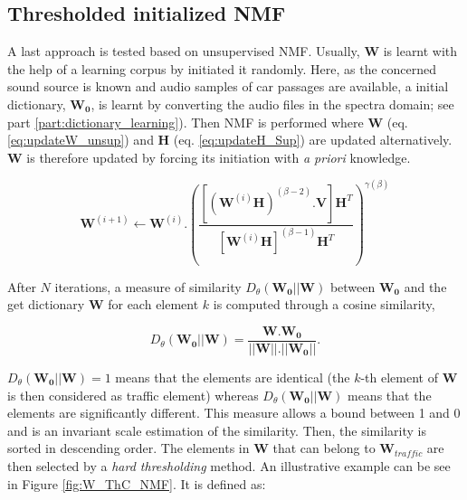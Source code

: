 \documentclass[twocolumn,a4paper,10pt]{article}
\begin{document}
\subsection{Thresholded initialized NMF}

A last approach is tested based on unsupervised NMF. Usually, $\mathbf{W}$ is learnt with the help of a learning corpus by initiated it randomly. Here, as the concerned sound source is known and audio samples of car passages are available, a initial dictionary, $\mathbf{W_0}$, is learnt by converting the audio files in the spectra domain; see part \ref{part:dictionary_learning}). Then NMF is performed where $\mathbf{W}$ (eq. \ref{eq:updateW_unsup}) and $\mathbf{H}$ (eq.  \ref{eq:updateH_Sup}) are updated alternatively. $\mathbf{W}$ is therefore updated by forcing its initiation with \textit{a priori} knowledge.

\begin{equation}\label{eq:updateW_unsup}
\textbf{W}^{(i+1)} \leftarrow \mathbf{W}^{(i)}.\left(\frac{\left[\left(\mathbf{W}^{(i)}\mathbf{H} \right)^{(\beta-2)}.\mathbf{V} \right]\mathbf{H}^T}{\left[\mathbf{W}^{(i)}\mathbf{H} \right]^{(\beta-1)}\mathbf{H}^T}\right)^{\gamma(\beta)}
\end{equation}

After $N$ iterations, a measure of similarity $D_{\theta}\left(\mathbf{W_0} \vert \vert \mathbf{W} \right)$ between $\mathbf{W_0}$ and the get dictionary $\mathbf{W}$ for each element $k$ is computed through a cosine similarity,

\begin{equation}
D_{\theta}\left(\mathbf{W_0} \vert \vert \mathbf{W} \right) = \frac{\mathbf{W}.\mathbf{W_0}}{\vert \vert \mathbf{W}  \vert \vert . \vert \vert \mathbf{W_0} \vert \vert}.
\end{equation}

$D_{\theta}\left(\mathbf{W_0} \vert \vert \mathbf{W} \right) = 1$ means that the elements are identical (the $k$-th element of $\mathbf{W}$ is then considered as traffic element) whereas $D_{\theta}\left(\mathbf{W_0} \vert \vert \mathbf{W} \right)$ means that the elements are significantly different. This measure allows a bound between 1 and 0 and is an invariant scale estimation of the similarity. Then, the similarity is sorted in descending order. The elements in $\mathbf{W}$ that can belong to $\mathbf{W}_{traffic}$ are then selected by a \textit{hard thresholding} method. An illustrative example can be see in Figure \ref{fig:W_ThC_NMF}. It is defined as:
\end{document}
